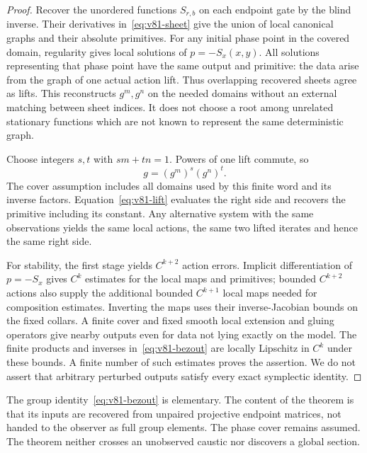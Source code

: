 \begin{proof}
Recover the unordered functions $S_{r,b}$ on each endpoint gate by the
blind inverse.  Their derivatives in~\eqref{eq:v81-sheet} give the
union of local canonical graphs and their absolute primitives.
For any initial phase point in the covered domain, regularity gives
local solutions of $p=-S_x(x,y)$.  All solutions representing that phase
point have the same output and primitive: the data arise from the graph
of one actual action lift.  Thus overlapping recovered sheets agree as
lifts.  This reconstructs $g^m,g^n$ on the needed domains without an
external matching between sheet indices.  It does not choose a root
among unrelated stationary functions which are not known to represent
the same deterministic graph.

Choose integers $s,t$ with $sm+tn=1$.  Powers of one lift commute, so
\begin{equation}\label{eq:v81-bezout}
                       g=(g^m)^s(g^n)^t.
\end{equation}
The cover assumption includes all domains used by this finite word and
its inverse factors.  Equation~\eqref{eq:v81-lift} evaluates the right
side and recovers the primitive including its constant.  Any alternative
system with the same observations yields the same local actions, the
same two lifted iterates and hence the same right side.

For stability, the first stage yields $C^{k+2}$ action errors.  Implicit
differentiation of $p=-S_x$ gives $C^k$ estimates for the local maps and
primitives; bounded $C^{k+2}$ actions also supply the additional bounded
$C^{k+1}$ local maps needed for composition estimates.  Inverting the
maps uses their inverse-Jacobian bounds on the fixed collars.  A finite
cover and fixed smooth local extension and gluing operators give
nearby outputs even for data not lying exactly on the model.  The
finite products and inverses in~\eqref{eq:v81-bezout} are locally
Lipschitz in $C^k$ under these bounds.  A finite number of such estimates
proves the assertion.  We do not assert that arbitrary perturbed outputs
satisfy every exact symplectic identity.
\end{proof}

The group identity~\eqref{eq:v81-bezout} is elementary.  The content of
the theorem is that its inputs are recovered from unpaired projective
endpoint matrices, not handed to the observer as full group elements.
The phase cover remains assumed.  The theorem neither crosses an
unobserved caustic nor discovers a global section.

